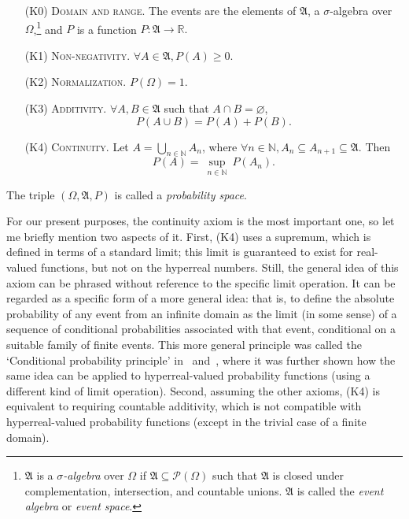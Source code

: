 \begin{itemize}
\item[(K0)] \textsc{Domain and range.} The events are the elements of $\mathfrak{A}$, a $\sigma$-algebra over $\Omega$,\footnote{$\mathfrak{A}$ is a \textit{$\sigma$-algebra} over $\Omega$ if $\mathfrak{A} \subseteq \mathcal{P}\left( \Omega \right)$ such that $\mathfrak{A}$ is closed under complementation, intersection, and countable unions. $\mathfrak{A}$ is called the \textit{event algebra} or \textit{event space}.} and $P$ is a function $P:\mathfrak{A} \rightarrow \mathbb{R}.$

\item[(K1)] \textsc{Non-negativity.} $\forall A\in \mathfrak{A}, P(A)\geq 0.$

\item[(K2)] \textsc{Normalization.} $P(\Omega )=1.$

\item[(K3)] \textsc{Additivity.} $\forall A, B \in \mathfrak{A}$ such that $A\cap B=\varnothing$,
$$P(A\cup B)=P(A)+P(B).$$

\item[(K4)] \textsc{Continuity.} Let $ A=\bigcup\limits_{n\in \mathbb{N}}A_{n}$,
where $\forall n\in \mathbb{N},A_{n}\subseteq A_{n+1}\subseteq \mathfrak{A}$. Then
$$ P(A)=\ \underset{n\in \mathbb{N}}{\sup }\ P(A_{n}). $$
\end{itemize}
The triple $(\Omega, \mathfrak{A}, P)$ is called a \textit{probability space}.

For our present purposes, the continuity axiom is the most important one, so let me briefly mention two aspects of it. First, (K4) uses a supremum, which is defined in terms of a standard limit; this limit is guaranteed to exist for real-valued functions, but not on the hyperreal numbers. Still, the general idea of this axiom can be phrased without reference to the specific limit operation. It can be regarded as a specific form of a more general idea: that is, to define the absolute probability of any event from an infinite domain as the limit (in some sense) of a sequence of conditional probabilities associated with that event, conditional on a suitable family of finite events. This more general principle was called the `Conditional probability principle' in~\citet[section~3.2]{Benci_etal:2013} and~\citet[section~3.2]{Benci_etal:2018}, where it was further shown how the same idea can be applied to hyperreal-valued probability functions (using a different kind of limit operation).
Second, assuming the other axioms, (K4) is equivalent to requiring countable additivity, which is not compatible with hyperreal-valued probability functions (except in the trivial case of a finite domain).

